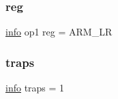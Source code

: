 \subsubsection{\texorpdfstring{reg}{reg}}
{\footnotesize\ttfamily \mbox{\hyperlink{libretro_8h_a283ad41e4809f9c0ebe736a9861d8a91}{info}} op1 reg = A\+R\+M\+\_\+\+LR}

\mbox{\label{decoder-thumb_8c_afe08430c255629bed908d9bf22397277}} 
\subsubsection{\texorpdfstring{traps}{traps}}
{\footnotesize\ttfamily \mbox{\hyperlink{libretro_8h_a283ad41e4809f9c0ebe736a9861d8a91}{info}} traps = 1}

